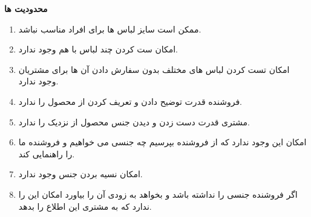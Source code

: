 \documentclass[12pt,a4paper]{article}
\begin{document}
\textbf{	محدودیت ها }

\begin{enumerate}
	

\item
ممکن است سایز لباس ها برای افراد مناسب نباشد.
\item
امکان ست کردن چند لباس با هم وجود ندارد.
\item
امکان تست کردن لباس های مختلف بدون سفارش دادن آن ها برای مشتریان وجود ندارد.
\item
فروشنده قدرت توضیح دادن و تعریف کردن از محصول را ندارد.
\item
مشتری قدرت دست زدن و دیدن جنس محصول از نزدیک را ندارد.
\item
امکان این وجود ندارد که از فروشنده بپرسیم چه جنسی می خواهیم و فروشنده ما را راهنمایی کند.
\item
امکان نسیه بردن جنس وجود ندارد.
\item
اگر فروشنده جنسی را نداشته باشد و بخواهد به زودی آن را بیاورد امکان این را ندارد که به مشتری این اطلاع را بدهد.
	
\end{enumerate}	
\pagebreak
\end{document}
